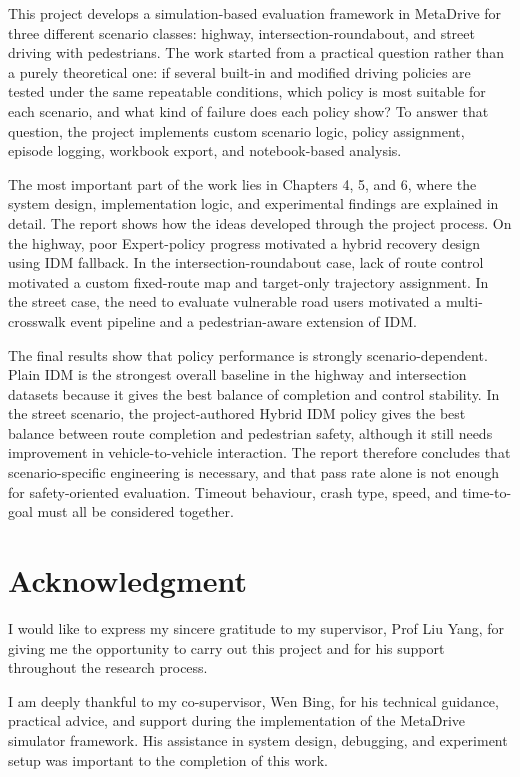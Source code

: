 \documentclass[12pt,a4paper]{report}
\begin{document}
This project develops a simulation-based evaluation framework in MetaDrive for three different scenario classes: highway, intersection-roundabout, and street driving with pedestrians. The work started from a practical question rather than a purely theoretical one: if several built-in and modified driving policies are tested under the same repeatable conditions, which policy is most suitable for each scenario, and what kind of failure does each policy show? To answer that question, the project implements custom scenario logic, policy assignment, episode logging, workbook export, and notebook-based analysis.

The most important part of the work lies in Chapters 4, 5, and 6, where the system design, implementation logic, and experimental findings are explained in detail. The report shows how the ideas developed through the project process. On the highway, poor Expert-policy progress motivated a hybrid recovery design using IDM fallback. In the intersection-roundabout case, lack of route control motivated a custom fixed-route map and target-only trajectory assignment. In the street case, the need to evaluate vulnerable road users motivated a multi-crosswalk event pipeline and a pedestrian-aware extension of IDM.

The final results show that policy performance is strongly scenario-dependent. Plain IDM is the strongest overall baseline in the highway and intersection datasets because it gives the best balance of completion and control stability. In the street scenario, the project-authored Hybrid IDM policy gives the best balance between route completion and pedestrian safety, although it still needs improvement in vehicle-to-vehicle interaction. The report therefore concludes that scenario-specific engineering is necessary, and that pass rate alone is not enough for safety-oriented evaluation. Timeout behaviour, crash type, speed, and time-to-goal must all be considered together.

\chapter*{Acknowledgment}
I would like to express my sincere gratitude to my supervisor, Prof Liu Yang, for giving me the opportunity to carry out this project and for his support throughout the research process.

I am deeply thankful to my co-supervisor, Wen Bing, for his technical guidance, practical advice, and support during the implementation of the MetaDrive simulator framework. His assistance in system design, debugging, and experiment setup was important to the completion of this work.
\end{document}
